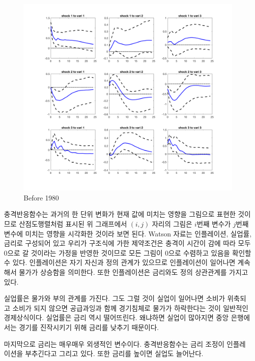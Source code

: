 \documentclass{article}
\begin{document}
  \begin{center}
  \begin{figure}
  \includegraphics[scale=0.25]{before80.png}
  \caption{Before 1980}
  \end{figure}
  \end{center}
  \par
  충격반응함수는 과거의 한 단위 변화가 현재 값에 미치는 영향을 그림으로 표현한 것이므로 산점도행렬처럼 표시된 위 그래프에서 $(i,j)$ 자리의 그림은 $i$번째 변수가 $j$번째 변수에 미치는 영향을 시각화한 것이라 보면 된다. Watson 자료는 인플레이션, 실업률, 금리로 구성되어 있고 우리가 구조식에 가한 제약조건은 충격이 시간이 감에 따라 모두 0으로 갈 것이라는 가정을 반영한 것이므로 모든 그림이 0으로 수렴하고 있음을 확인할 수 있다. 인플레이션은 자기 자신과 정의 관계가 있으므로 인플레이션이 일어나면 계속해서 물가가 상승함을 의미한다. 또한 인플레이션은 금리와도 정의 상관관계를 가지고 있다.\par
  실업률은 물가와 부의 관계를 가진다. 그도 그럴 것이 실업이 일어나면 소비가 위축되고 소비가 되지 않으면 공급과잉과 함께 경기침체로 물가가 하락한다는 것이 일반적인 경제상식이다. 실업률은 금리 역시 떨어뜨린다. 왜냐하면 실업이 많아지면 중앙 은행에서는 경기를 진작시키기 위해 금리를 낮추기 때문이다.\par
  마지막으로 금리는 매우매우 외생적인 변수이다. 충격반응함수는 금리 조정이 인플레이션을 부추긴다고 그리고 있다. 또한 금리를 높이면 실업도 늘어난다.\par
\end{document}
